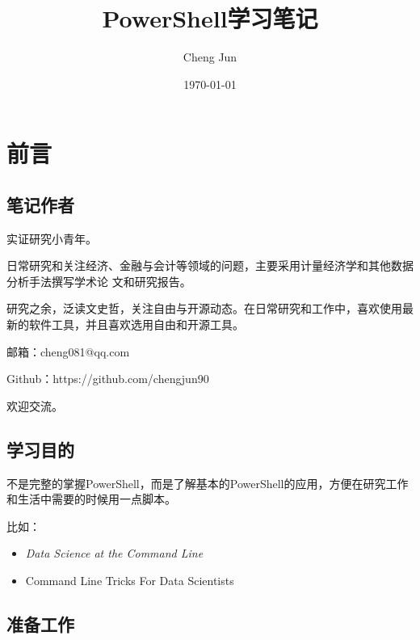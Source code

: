 \documentclass[11pt]{ctexart}
\title{\textbf{\LARGE{PowerShell学习笔记}}}
\author{Cheng Jun}
\date{\today}
\providecommand{\tightlist}{%
      \setlength{\itemsep}{0pt}\setlength{\parskip}{0pt}}
\begin{document}
    
    
    \maketitle
    \tableofcontents
    \clearpage
    
    

    
    \hypertarget{ux524dux8a00}{%
\section{前言}\label{ux524dux8a00}}

    \hypertarget{ux7b14ux8bb0ux4f5cux8005}{%
\subsection{笔记作者}\label{ux7b14ux8bb0ux4f5cux8005}}

    实证研究小青年。

日常研究和关注经济、金融与会计等领域的问题，主要采用计量经济学和其他数据分析手法撰写学术论
文和研究报告。

研究之余，泛读文史哲，关注自由与开源动态。在日常研究和工作中，喜欢使用最新的软件工具，并且喜欢选用自由和开源工具。

邮箱：cheng081@qq.com

Github：https://github.com/chengjun90

欢迎交流。

    \hypertarget{ux5b66ux4e60ux76eeux7684}{%
\subsection{学习目的}\label{ux5b66ux4e60ux76eeux7684}}

    不是完整的掌握PowerShell，而是了解基本的PowerShell的应用，方便在研究工作和生活中需要的时候用一点脚本。

比如：

\begin{itemize}
\tightlist
\item
  \emph{Data Science at the Command Line}
\item
  Command Line Tricks For Data Scientists
\end{itemize}

    \hypertarget{ux51c6ux5907ux5de5ux4f5c}{%
\subsection{准备工作}\label{ux51c6ux5907ux5de5ux4f5c}}
\end{document}
